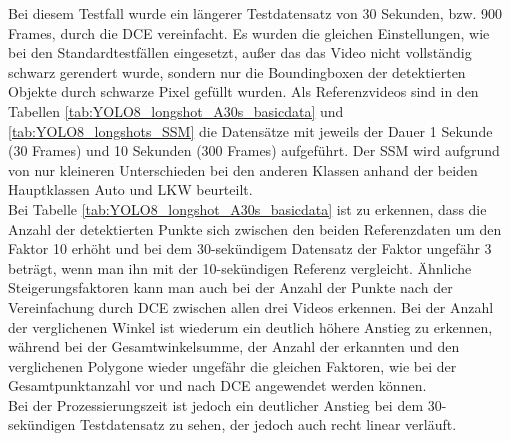 {	Bei diesem Testfall wurde ein längerer Testdatensatz von 30 Sekunden, bzw. 900 Frames, durch die DCE vereinfacht. Es wurden die gleichen Einstellungen, wie bei den Standardtestfällen eingesetzt, außer das das Video nicht vollständig schwarz gerendert wurde, sondern nur die Boundingboxen der detektierten Objekte durch schwarze Pixel gefüllt wurden. Als Referenzvideos sind in den Tabellen \ref{tab:YOLO8_longshot_A30s_basicdata} und \ref{tab:YOLO8_longshots_SSM} die Datensätze mit jeweils der Dauer 1 Sekunde (30 Frames) und 10 Sekunden (300 Frames) aufgeführt. Der SSM wird aufgrund von nur kleineren Unterschieden bei den anderen Klassen anhand der beiden Hauptklassen Auto und LKW beurteilt. \\
	Bei Tabelle \ref{tab:YOLO8_longshot_A30s_basicdata} ist zu erkennen, dass die Anzahl der detektierten Punkte sich zwischen den beiden Referenzdaten um den Faktor 10 erhöht und bei dem 30-sekündigem Datensatz der Faktor ungefähr 3 beträgt, wenn man ihn mit der 10-sekündigen Referenz vergleicht. Ähnliche Steigerungsfaktoren kann man auch bei der Anzahl der Punkte nach der Vereinfachung durch DCE zwischen allen drei Videos erkennen. Bei der Anzahl der verglichenen Winkel ist wiederum ein deutlich höhere Anstieg zu erkennen, während bei der Gesamtwinkelsumme, der Anzahl der erkannten und den verglichenen Polygone wieder ungefähr die gleichen Faktoren, wie bei der Gesamtpunktanzahl vor und nach DCE angewendet werden können. \\
	Bei der Prozessierungszeit ist jedoch ein deutlicher Anstieg bei dem 30-sekündigen Testdatensatz zu sehen, der jedoch auch recht linear verläuft.

	
	

}
